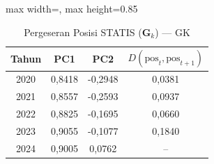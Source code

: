 \begin{table}[H]
\centering
\caption{Pergeseran Posisi STATIS ($\mathbf{G}_k$) --- GK} \label{tab:app2jarak_statis_loading_gk}
\begin{adjustbox}{max width=\textwidth, max height=0.85\textheight}
\begin{tabular}{|c|c|c|c|}
\hline
\textbf{Tahun} & \textbf{PC1} & \textbf{PC2} & \textbf{$D(\text{pos}_t, \text{pos}_{t+1})$} \\
\hline
2020 & 0,8418 & -0,2948 & 0,0381 \\
2021 & 0,8557 & -0,2593 & 0,0937 \\
2022 & 0,8825 & -0,1695 & 0,0660 \\
2023 & 0,9055 & -0,1077 & 0,1840 \\
2024 & 0,9005 & 0,0762 & -- \\
\hline
\end{tabular}
\end{adjustbox}
\end{table}